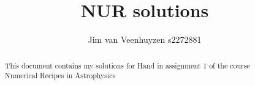 \documentclass[a4paper,10pt]{article}
\title{NUR solutions}
\author{Jim van Veenhuyzen s2272881}
\begin{document}
\maketitle

\begin{abstract}
This document contains my solutions for Hand in assignment 1 of the course Numerical Recipes in Astrophysics
\end{abstract}




\end{document}
